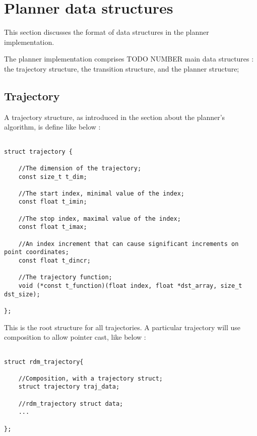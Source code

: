 \newpage

\section{Planner data structures}

This section discusses the format of data structures in the planner implementation.

The planner implementation comprises {\color{red} TODO NUMBER} main data structures :
the trajectory structure, the transition structure, and the planner structure;

\subsection{Trajectory}

A trajectory structure, as introduced in the section about the planner's algorithm, is 
define like below :

\begin{lstlisting}[style=CStyle]

struct trajectory {
	
	//The dimension of the trajectory;
	const size_t t_dim;
	
	//The start index, minimal value of the index;
	const float t_imin;
	
	//The stop index, maximal value of the index;
	const float t_imax;
	
	//An index increment that can cause significant increments on point coordinates;
	const float t_dincr;
	
	//The trajectory function;
	void (*const t_function)(float index, float *dst_array, size_t dst_size);
	
};

\end{lstlisting}

This is the root structure for all trajectories. A particular trajectory will use composition 
to allow pointer cast, like below : 

\begin{lstlisting}[style=CStyle]

struct rdm_trajectory{

	//Composition, with a trajectory struct;
	struct trajectory traj_data;
	
	//rdm_trajectory struct data;
	...	

};

\end{lstlisting}


